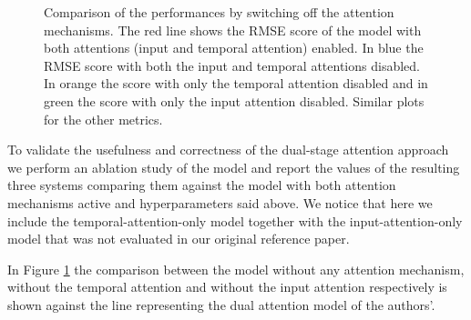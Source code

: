 \documentclass{article}
\begin{document}
\begin{figure}[ht]
  \centering
  \caption{Comparison of the performances by switching off the attention
  mechanisms. The red line shows the RMSE score of the model with both
  attentions (input and temporal attention) enabled. In blue the RMSE score
  with both the input and temporal attentions disabled. In orange the score
  with only the temporal attention disabled and in green the score with
  only the input attention disabled. Similar plots for the other metrics.}
  \label{fig:ablation}
\end{figure}

To validate the usefulness and correctness of the dual-stage attention approach
we perform an ablation study of the model and report the values of the
resulting three systems comparing them against the model with both attention
mechanisms active and hyperparameters said above. We notice that here we
include the temporal-attention-only model together with the
input-attention-only model that was not evaluated in our original reference
paper.

In Figure \ref{fig:ablation} the comparison between the model without any
attention mechanism, without the temporal attention and without the input
attention respectively is shown against the line representing the dual
attention model of the authors'.
\end{document}
